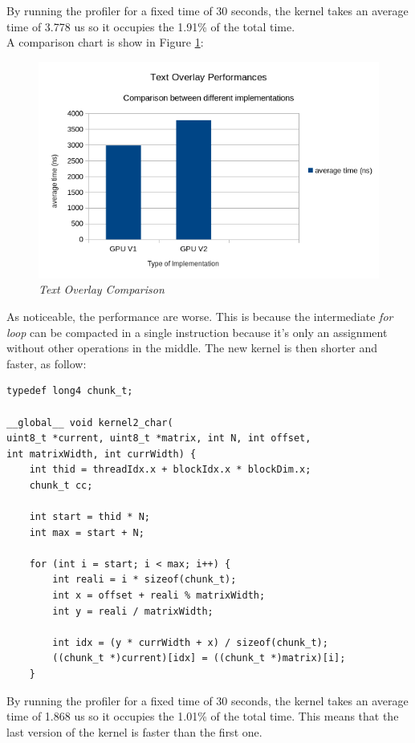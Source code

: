 \documentclass[paper=a4, fontsize=10pt]{scrartcl}	%
\begin{document}
	
	By running the profiler for a fixed time of 30 seconds, the kernel takes an average time of 3.778 us so it occupies the 1.91\% of the total time.\\

	A comparison chart is show in Figure \ref{fig:chart8}:

	\begin{figure}[H]
		\centering
		\includegraphics[width=0.9\linewidth]{images/chart8.png}
		\caption{\textit{Text Overlay Comparison}}
		\label{fig:chart8}
	\end{figure}

	As noticeable, the performance are worse. This is because the intermediate \textit{for loop} can be compacted in a single instruction because it's only an assignment without other operations in the middle. The new kernel is then shorter and faster, as follow:

	\begin{lstlisting}[style=CStyle]
typedef long4 chunk_t;

__global__ void kernel2_char(
uint8_t *current, uint8_t *matrix, int N, int offset, 
int matrixWidth, int currWidth) {
    int thid = threadIdx.x + blockIdx.x * blockDim.x;
    chunk_t cc;

    int start = thid * N;
    int max = start + N;

    for (int i = start; i < max; i++) {
        int reali = i * sizeof(chunk_t);
        int x = offset + reali % matrixWidth;
        int y = reali / matrixWidth;

        int idx = (y * currWidth + x) / sizeof(chunk_t);
        ((chunk_t *)current)[idx] = ((chunk_t *)matrix)[i];
    } 
	\end{lstlisting}

	By running the profiler for a fixed time of 30 seconds, the kernel takes an average time of 1.868 us so it occupies the 1.01\% of the total time. This means that the last version of the kernel is faster than the first one.\\
\end{document}
